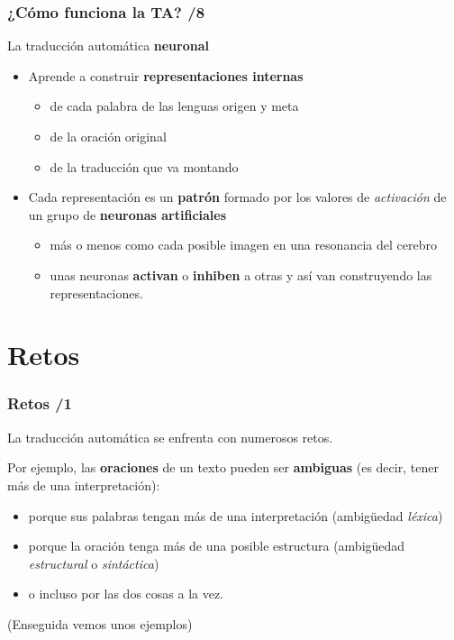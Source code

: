 \documentclass{beamer}
\newcommand{\empha}[1]{\emph{#1}}
\begin{document}
\begin{frame}
\frametitle{¿Cómo funciona la TA? /8}
La traducción automática \textbf{neuronal}\pause
\begin{itemize}
\item Aprende a construir \textbf{representaciones internas}\pause
  \begin{itemize}
  \item de cada palabra de las lenguas origen y meta\pause
  \item de la oración original\pause
  \item de la traducción que va montando\pause
  \end{itemize}
\item Cada representación es un \textbf{patrón} formado por los valores de
  \emph{activación} de un grupo de \textbf{neuronas artificiales}\pause
  \begin{itemize}
  \item más o menos como cada posible imagen en una
    resonancia del cerebro\pause
  \item unas neuronas \textbf{activan} o \textbf{inhiben} a otras y así van construyendo las
    representaciones.
  \end{itemize}


\end{itemize}


\end{frame}

\section{Retos}
\begin{frame}
\frametitle{Retos /1}

La traducción automática se enfrenta con numerosos retos.\pause


Por ejemplo, las \textbf{oraciones} de un texto pueden ser
\textbf{ambiguas} (es decir, tener más de una interpretación):\pause

\begin{itemize}
\item porque sus palabras tengan más de una interpretación (ambigüedad
  \empha{léxica})\pause


\item porque la oración tenga más de una posible estructura  (ambigüedad \empha{estructural} o \empha{sintáctica})\pause

\item o incluso por las dos cosas a la vez.\pause
\end{itemize}
(Enseguida vemos unos ejemplos)
\end{frame}
\end{document}
